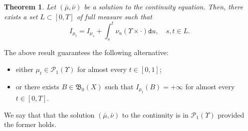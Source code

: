 \documentclass[JEP,XML,SOM,Unicode,published]{cedram}
\newtheorem{theorem}{Theorem}[section]
\theoremstyle{definition}
\theoremstyle{remark}
\begin{document}
\begin{theorem}\label{t:ce-intensity-measure}
Let $(\bar{\mu}, \bar{\nu})$ be a solution to the continuity equation.
Then, there exists a set $L \subset [0,T]$ of full measure such that
\begin{equation*}
I_{\mu_{t}} = I_{\mu_{s}} + \int_{s}^{t} \nu_{u}(\varUpsilon \times \cdot) \mathtt{d} u, \quad s, t\in L .
\end{equation*}
\end{theorem}
The above result guarantees the following alternative:
\begin{itemize}[wide]
\item either $\mu_{t} \in \mathscr{P}_{1}(\varUpsilon)$ for almost every $t \in [0,1]$;
\item or there exists $B \in \mathfrak{B}_{0}(X)$ such that $I_{\mu_{t}}(B) = + \infty$ for almost every $t \in [0,T]$.
\end{itemize}
We say that that the solution $(\bar{\mu}, \bar{\nu})$ to the continuity is in $\mathscr{P}_{1}(\varUpsilon)$ provided the former holds.
\end{document}
